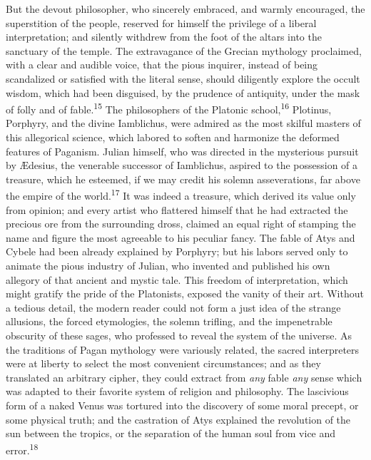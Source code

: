 But the devout philosopher, who sincerely embraced, and warmly
encouraged, the superstition of the people, reserved for himself
the privilege of a liberal interpretation; and silently withdrew
from the foot of the altars into the sanctuary of the temple. The
extravagance of the Grecian mythology proclaimed, with a clear
and audible voice, that the pious inquirer, instead of being
scandalized or satisfied with the literal sense, should
diligently explore the occult wisdom, which had been disguised,
by the prudence of antiquity, under the mask of folly and of
fable.\textsuperscript{15} The philosophers of the Platonic school,\textsuperscript{16} Plotinus,
Porphyry, and the divine Iamblichus, were admired as the most
skilful masters of this allegorical science, which labored to
soften and harmonize the deformed features of Paganism. Julian
himself, who was directed in the mysterious pursuit by Ædesius,
the venerable successor of Iamblichus, aspired to the possession
of a treasure, which he esteemed, if we may credit his solemn
asseverations, far above the empire of the world.\textsuperscript{17} It was
indeed a treasure, which derived its value only from opinion; and
every artist who flattered himself that he had extracted the
precious ore from the surrounding dross, claimed an equal right
of stamping the name and figure the most agreeable to his
peculiar fancy. The fable of Atys and Cybele had been already
explained by Porphyry; but his labors served only to animate the
pious industry of Julian, who invented and published his own
allegory of that ancient and mystic tale. This freedom of
interpretation, which might gratify the pride of the Platonists,
exposed the vanity of their art. Without a tedious detail, the
modern reader could not form a just idea of the strange
allusions, the forced etymologies, the solemn trifling, and the
impenetrable obscurity of these sages, who professed to reveal
the system of the universe. As the traditions of Pagan mythology
were variously related, the sacred interpreters were at liberty
to select the most convenient circumstances; and as they
translated an arbitrary cipher, they could extract from \textit{any}
fable \textit{any} sense which was adapted to their favorite system of
religion and philosophy. The lascivious form of a naked Venus was
tortured into the discovery of some moral precept, or some
physical truth; and the castration of Atys explained the
revolution of the sun between the tropics, or the separation of
the human soul from vice and error.\textsuperscript{18}


